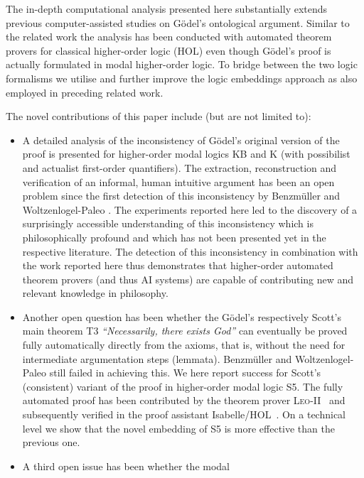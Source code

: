 \documentclass{article}
\begin{document}
The in-depth computational analysis presented here substantially
extends previous computer-assisted studies on G\"odel's ontological
argument. Similar to the related work \cite{J30,C40} the analysis has
been conducted with automated theorem provers for classical
higher-order logic (HOL) even though G\"odel's proof is actually
formulated in modal higher-order logic. To bridge between the two
logic formalisms we utilise and further improve the logic embeddings
approach \cite{J23,C40} as also employed in preceding related work.


The novel contributions of this paper include (but are not limited to):


\begin{itemize}
\item A detailed analysis of the inconsistency of G\"{o}del's
   original version of the proof is presented
  for higher-order modal logics KB and K (with possibilist and
  actualist first-order quantifiers). The extraction, reconstruction
  and verification of an informal, human intuitive argument has been
  an open problem since the first detection of this inconsistency by
  Benzmüller and Woltzenlogel-Paleo . The experiments
  reported here led to the discovery of a surprisingly accessible
  understanding of this inconsistency which is philosophically
  profound and which has not been presented yet in the respective
  literature. The detection of this inconsistency in combination with
  the work reported here thus demonstrates that higher-order automated
  theorem provers (and thus AI systems) are capable of contributing
  new and relevant knowledge in philosophy. 
\item Another open question has been whether the G\"odel's
  respectively Scott's main theorem T3 \textit{``Necessarily, there
    exists God''} can eventually be proved fully automatically
  directly from the axioms, that is, without the need for intermediate
  argumentation steps (lemmata). Benzm\"uller and Woltzenlogel-Paleo
   still failed in achieving this. We here report
  success for Scott's (consistent) variant of the proof in
  higher-order modal logic S5. The fully automated proof has been
  contributed by the theorem prover \textsc{Leo-II}~\cite{C26} and
  subsequently verified in the proof assistant
  Isabelle/HOL~\cite{NPW02}. On a technical level we show that the
  novel embedding of S5 is more effective than the previous one.
\item A third open issue has been whether the modal

\end{itemize}
\end{document}
